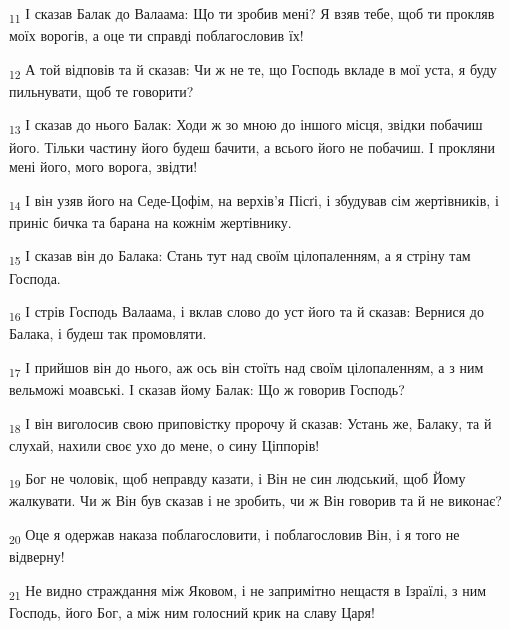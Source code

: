 \begin{tcolorbox}
\textsubscript{11} І сказав Балак до Валаама: Що ти зробив мені? Я взяв тебе, щоб ти прокляв моїх ворогів, а оце ти справді поблагословив їх!
\end{tcolorbox}
\begin{tcolorbox}
\textsubscript{12} А той відповів та й сказав: Чи ж не те, що Господь вкладе в мої уста, я буду пильнувати, щоб те говорити?
\end{tcolorbox}
\begin{tcolorbox}
\textsubscript{13} І сказав до нього Балак: Ходи ж зо мною до іншого місця, звідки побачиш його. Тільки частину його будеш бачити, а всього його не побачиш. І прокляни мені його, мого ворога, звідти!
\end{tcolorbox}
\begin{tcolorbox}
\textsubscript{14} І він узяв його на Седе-Цофім, на верхів'я Пісґі, і збудував сім жертівників, і приніс бичка та барана на кожнім жертівнику.
\end{tcolorbox}
\begin{tcolorbox}
\textsubscript{15} І сказав він до Балака: Стань тут над своїм цілопаленням, а я стріну там Господа.
\end{tcolorbox}
\begin{tcolorbox}
\textsubscript{16} І стрів Господь Валаама, і вклав слово до уст його та й сказав: Вернися до Балака, і будеш так промовляти.
\end{tcolorbox}
\begin{tcolorbox}
\textsubscript{17} І прийшов він до нього, аж ось він стоїть над своїм цілопаленням, а з ним вельможі моавські. І сказав йому Балак: Що ж говорив Господь?
\end{tcolorbox}
\begin{tcolorbox}
\textsubscript{18} І він виголосив свою приповістку пророчу й сказав: Устань же, Балаку, та й слухай, нахили своє ухо до мене, о сину Ціппорів!
\end{tcolorbox}
\begin{tcolorbox}
\textsubscript{19} Бог не чоловік, щоб неправду казати, і Він не син людський, щоб Йому жалкувати. Чи ж Він був сказав і не зробить, чи ж Він говорив та й не виконає?
\end{tcolorbox}
\begin{tcolorbox}
\textsubscript{20} Оце я одержав наказа поблагословити, і поблагословив Він, і я того не відверну!
\end{tcolorbox}
\begin{tcolorbox}
\textsubscript{21} Не видно страждання між Яковом, і не запримітно нещастя в Ізраїлі, з ним Господь, його Бог, а між ним голосний крик на славу Царя!
\end{tcolorbox}
